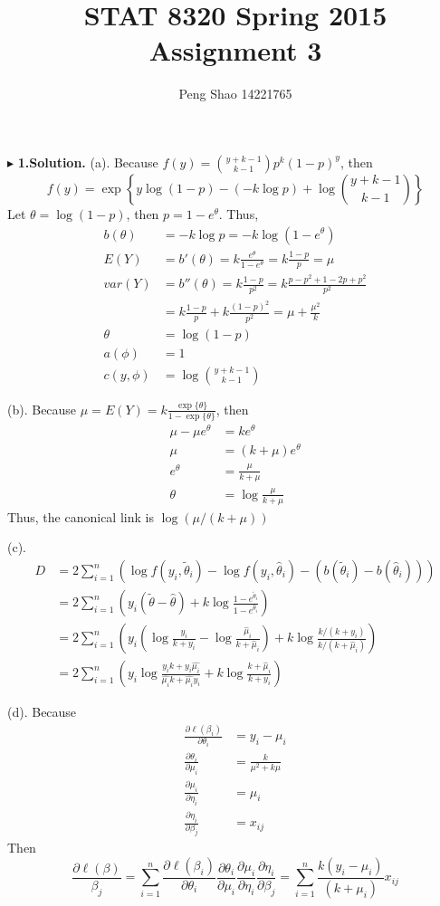 \documentclass[letterpaper, 12pt]{article}
\newcommand{\ba}{$$\begin{aligned}}
\newcommand{\ea}{\end{aligned}$$}
\begin{document}
\title{STAT 8320 Spring 2015 Assignment 3}
\author{Peng Shao 14221765}
\maketitle
\indent




$\blacktriangleright$ \textbf{1.\quad Solution.} 
(a). Because $f(y)=\binom{y+k-1}{k-1}p^k(1-p)^y$, then
$$
f(y)=\exp\left\{y\log(1-p)-(-k\log p)+\log\binom{y+k-1}{k-1}\right\}
$$
Let $\theta=\log(1-p)$, then $p=1-e^\theta$. Thus,
\ba
b(\theta)&=-k\log p=-k \log(1-e^\theta)\\
E(Y)&=b'(\theta)=k\frac{e^\theta}{1-e^\theta}=k\frac{1-p}{p}=\mu\\
var(Y)&=b''(\theta)=k\frac{1-p}{p^2}=k\frac{p-p^2+1-2p+p^2}{p^2}\\
&=k\frac{1-p}{p}+k\frac{(1-p)^2}{p^2}=\mu+\frac{\mu^2}{k}\\
\theta&=\log(1-p)\\
a(\phi)&=1\\
c(y,\phi)&=\log\binom{y+k-1}{k-1}
\ea



(b). Because $\mu=E(Y)=k\frac{\exp\{\theta\}}{1-\exp\{\theta\}}$, then
\ba
\mu-\mu e^\theta&=ke^\theta\\
\mu&=(k+\mu)e^\theta\\
e^\theta&=\frac{\mu}{k+\mu}\\
\theta&=\log \frac{\mu}{k+\mu}
\ea
Thus, the canonical link is $\log (\mu/(k+\mu))$



  
(c). \ba
D&=2\sum_{i=1}^{n}(\log f(y_i,\tilde{\theta}_i)-\log f(y_i,\hat{\theta}_i)-(b(\tilde{\theta}_i)-b(\hat{\theta}_i)))\\
&=2\sum_{i=1}^{n}\left(y_i(\tilde{\theta}-\hat{\theta})+k\log\frac{1-e^{\tilde{\theta}_i}}{1-e^{\hat{\theta}_i}}\right)\\
&=2\sum_{i=1}^{n}\left(y_i(\log\frac{y_i}{k+y_i}-\log\frac{\hat{\mu}_i}{k+\hat{\mu}_i})+k\log\frac{k/(k+y_i)}{k/(k+\hat{\mu}_i)}\right)\\
&=2\sum_{i=1}^{n}\left(y_i\log\frac{y_ik+y_i\hat{\mu_i}}{\hat{\mu_i}k+\hat{\mu_i}y_i}+k\log\frac{k+\hat{\mu}_i}{k+y_i}\right)
\ea

(d). Because
\ba
\frac{\partial \ell(\beta_i)}{\partial \theta_i}&=y_i-\mu_i\\
\frac{\partial \theta_i}{\partial \mu_i}&=\frac{k}{\mu^2+k\mu}\\
\frac{\partial \mu_i}{\partial \eta_i}&=\mu_i\\
\frac{\partial \eta_i}{\partial \beta_j}&=x_{ij}
\ea
Then
$$
\frac{\partial \ell(\beta)}{\beta_j}=\sum_{i=1}^{n}\frac{\partial \ell(\beta_i)}{\partial \theta_i}\frac{\partial \theta_i}{\partial \mu_i}\frac{\partial \mu_i}{\partial \eta_i}\frac{\partial \eta_i}{\partial \beta_j}=\sum_{i=1}^{n}\frac{k(y_i-\mu_i)}{(k+\mu_i)}x_{ij}
$$
\end{document}
